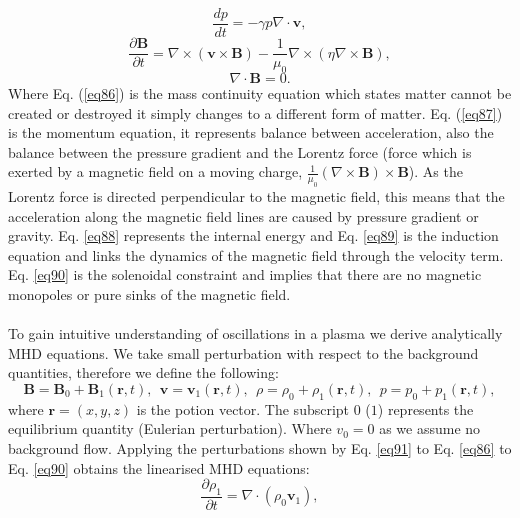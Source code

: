\documentclass[12pt,a4paper,twoside]{article}
\begin{document}
\begin{equation}\label{eq88}
\frac{dp}{dt} = - \gamma p \nabla \cdot \boldsymbol{v},
\end{equation}
\begin{equation}\label{eq89}
\frac{\partial \boldsymbol{B}}{\partial t} = \nabla \times (\boldsymbol{v} \times \boldsymbol{B}) - \frac{1}{\mu_0} \nabla \times (\eta \nabla \times \boldsymbol{B}),
\end{equation}
\begin{equation}\label{eq90}
\nabla \cdot \boldsymbol{B} = 0.
\end{equation}
Where Eq. (\ref{eq86}) is the mass continuity equation which states matter cannot be created or destroyed it simply changes to a different form of matter. Eq. (\ref{eq87}) is the momentum equation, it represents balance between acceleration, also the balance between the pressure gradient and the Lorentz force (force which is exerted by a magnetic field on a moving charge, $\frac{1}{\mu_0} (\nabla \times \boldsymbol{B}) \times \boldsymbol{B}$). As the Lorentz force is directed perpendicular to the magnetic field, this means that the acceleration along the magnetic field lines are caused by pressure gradient or gravity. Eq. \eqref{eq88} represents the internal energy and Eq. \eqref{eq89} is the induction equation and links the dynamics of the magnetic field through the velocity term. Eq. \eqref{eq90} is the solenoidal constraint and implies that there are no magnetic monopoles or pure sinks of the magnetic field.\\ \\ To gain intuitive understanding of oscillations in a plasma we derive analytically MHD equations. We take small perturbation with respect to the background quantities, therefore we define the following:
\begin{equation} \label{eq91}
\boldsymbol{B} = \boldsymbol{B}_0 + \boldsymbol{B}_1 (\boldsymbol{r},t) , \ \ \boldsymbol{v} = \boldsymbol{v}_1 (\boldsymbol{r}, t) , \ \ \rho = \rho_0 + \rho_1 ( \boldsymbol{r},t) , \ \ p = p_0 + p_1 ( \boldsymbol{r}, t) ,
\end{equation}
where $\boldsymbol{r} = (x,y,z)$ is the potion vector. The subscript $0$ ($1$) represents the equilibrium quantity (Eulerian perturbation). Where $v_0=0$ as we assume no background flow. Applying the perturbations shown by Eq. \eqref{eq91} to Eq. \eqref{eq86} to Eq. \eqref{eq90} obtains the linearised MHD equations: 
\begin{equation}
\frac{\partial \rho_1}{\partial t} = \nabla \cdot (\rho_0 \boldsymbol{v}_1) ,
\end{equation}
\end{document}
